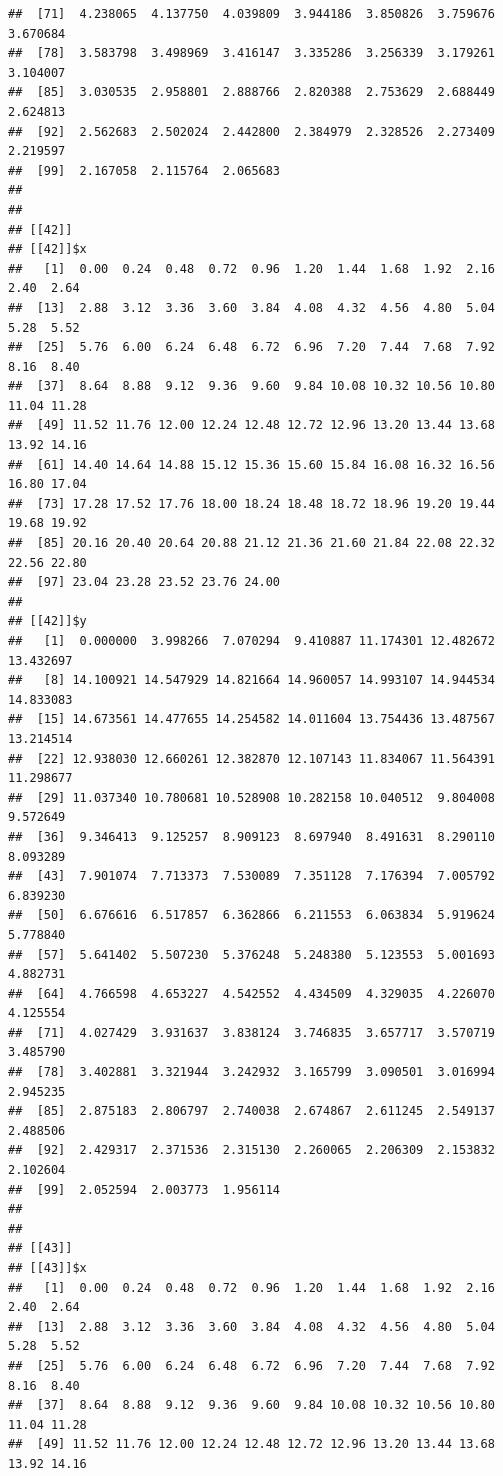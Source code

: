 \documentclass[
  ignorenonframetext,
]{beamer}
\begin{document}
\begin{frame}[fragile]{}
\begin{verbatim}
##  [71]  4.238065  4.137750  4.039809  3.944186  3.850826  3.759676  3.670684
##  [78]  3.583798  3.498969  3.416147  3.335286  3.256339  3.179261  3.104007
##  [85]  3.030535  2.958801  2.888766  2.820388  2.753629  2.688449  2.624813
##  [92]  2.562683  2.502024  2.442800  2.384979  2.328526  2.273409  2.219597
##  [99]  2.167058  2.115764  2.065683
## 
## 
## [[42]]
## [[42]]$x
##   [1]  0.00  0.24  0.48  0.72  0.96  1.20  1.44  1.68  1.92  2.16  2.40  2.64
##  [13]  2.88  3.12  3.36  3.60  3.84  4.08  4.32  4.56  4.80  5.04  5.28  5.52
##  [25]  5.76  6.00  6.24  6.48  6.72  6.96  7.20  7.44  7.68  7.92  8.16  8.40
##  [37]  8.64  8.88  9.12  9.36  9.60  9.84 10.08 10.32 10.56 10.80 11.04 11.28
##  [49] 11.52 11.76 12.00 12.24 12.48 12.72 12.96 13.20 13.44 13.68 13.92 14.16
##  [61] 14.40 14.64 14.88 15.12 15.36 15.60 15.84 16.08 16.32 16.56 16.80 17.04
##  [73] 17.28 17.52 17.76 18.00 18.24 18.48 18.72 18.96 19.20 19.44 19.68 19.92
##  [85] 20.16 20.40 20.64 20.88 21.12 21.36 21.60 21.84 22.08 22.32 22.56 22.80
##  [97] 23.04 23.28 23.52 23.76 24.00
## 
## [[42]]$y
##   [1]  0.000000  3.998266  7.070294  9.410887 11.174301 12.482672 13.432697
##   [8] 14.100921 14.547929 14.821664 14.960057 14.993107 14.944534 14.833083
##  [15] 14.673561 14.477655 14.254582 14.011604 13.754436 13.487567 13.214514
##  [22] 12.938030 12.660261 12.382870 12.107143 11.834067 11.564391 11.298677
##  [29] 11.037340 10.780681 10.528908 10.282158 10.040512  9.804008  9.572649
##  [36]  9.346413  9.125257  8.909123  8.697940  8.491631  8.290110  8.093289
##  [43]  7.901074  7.713373  7.530089  7.351128  7.176394  7.005792  6.839230
##  [50]  6.676616  6.517857  6.362866  6.211553  6.063834  5.919624  5.778840
##  [57]  5.641402  5.507230  5.376248  5.248380  5.123553  5.001693  4.882731
##  [64]  4.766598  4.653227  4.542552  4.434509  4.329035  4.226070  4.125554
##  [71]  4.027429  3.931637  3.838124  3.746835  3.657717  3.570719  3.485790
##  [78]  3.402881  3.321944  3.242932  3.165799  3.090501  3.016994  2.945235
##  [85]  2.875183  2.806797  2.740038  2.674867  2.611245  2.549137  2.488506
##  [92]  2.429317  2.371536  2.315130  2.260065  2.206309  2.153832  2.102604
##  [99]  2.052594  2.003773  1.956114
## 
## 
## [[43]]
## [[43]]$x
##   [1]  0.00  0.24  0.48  0.72  0.96  1.20  1.44  1.68  1.92  2.16  2.40  2.64
##  [13]  2.88  3.12  3.36  3.60  3.84  4.08  4.32  4.56  4.80  5.04  5.28  5.52
##  [25]  5.76  6.00  6.24  6.48  6.72  6.96  7.20  7.44  7.68  7.92  8.16  8.40
##  [37]  8.64  8.88  9.12  9.36  9.60  9.84 10.08 10.32 10.56 10.80 11.04 11.28
##  [49] 11.52 11.76 12.00 12.24 12.48 12.72 12.96 13.20 13.44 13.68 13.92 14.16

\end{verbatim}
\end{frame}
\end{document}
